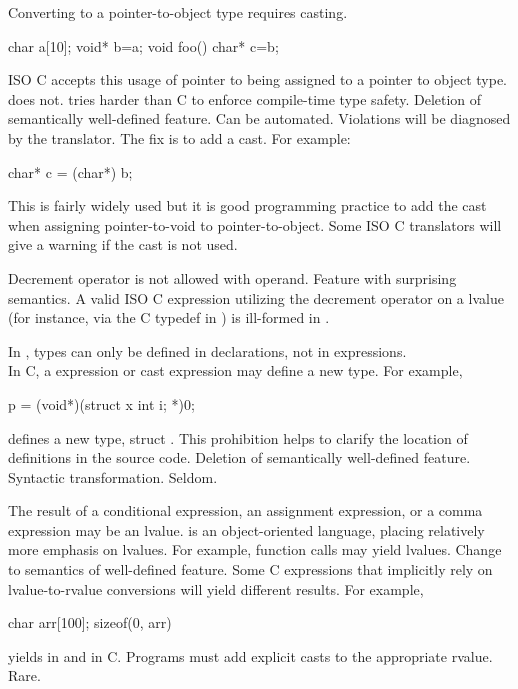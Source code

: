 \change
Converting  to a pointer-to-object type requires casting.
\begin{codeblock}
char a[10];
void* b=a;
void foo() {
  char* c=b;
}
\end{codeblock}

ISO C accepts this usage of pointer to  being assigned
to a pointer to object type.
\Cpp{} does not.
\rationale
\Cpp{} tries harder than C to enforce compile-time type safety.
\effect
Deletion of semantically well-defined feature.
\difficulty
Can be automated.
Violations will be diagnosed by the \Cpp{} translator.
The
fix is to add a  cast.
For example:
\begin{codeblock}
char* c = (char*) b;
\end{codeblock}

\howwide
This is fairly widely used but it is good
programming practice to add the cast when assigning pointer-to-void to pointer-to-object.
Some ISO C translators will give a warning
if the cast is not used.

\change
Decrement operator is not allowed with  operand.
\rationale
Feature with surprising semantics.
\effect
A valid ISO C expression utilizing the decrement operator on
a  lvalue
(for instance, via the C typedef in )
is ill-formed in \Cpp{}.

\change
In \Cpp{}, types can only be defined in declarations, not in expressions.\\
In C, a  expression or cast expression may define a new type.
For example,
\begin{codeblock}
p = (void*)(struct x {int i;} *)0;
\end{codeblock}
defines a new type, struct .
\rationale
This prohibition helps to clarify the location of
definitions in the source code.
\effect
Deletion of semantically well-defined feature.
\difficulty
Syntactic transformation.
\howwide
Seldom.

%
%
%
\change
The result of a conditional expression, an assignment expression, or a comma expression may be an lvalue.
\rationale
\Cpp{} is an object-oriented language, placing relatively
more emphasis on lvalues.  For example, function calls may
yield lvalues.
\effect
Change to semantics of well-defined feature.  Some C
expressions that implicitly rely on lvalue-to-rvalue
conversions will yield different results.
For example,
\begin{codeblock}
char arr[100];
sizeof(0, arr)
\end{codeblock}
yields
in \Cpp{} and
in C.
\difficulty
Programs must add explicit casts to the appropriate rvalue.
\howwide
Rare.

